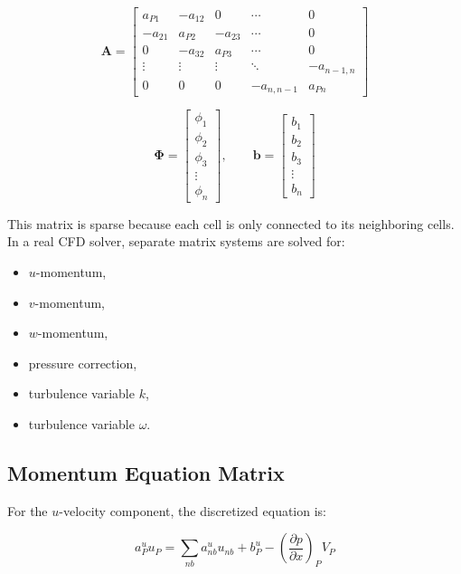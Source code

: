 \documentclass[12pt,a4paper]{article}
\begin{document}
\begin{equation}
\bm{A}
=
\begin{bmatrix}
a_{P1} & -a_{12} & 0 & \cdots & 0 \\
-a_{21} & a_{P2} & -a_{23} & \cdots & 0 \\
0 & -a_{32} & a_{P3} & \cdots & 0 \\
\vdots & \vdots & \vdots & \ddots & -a_{n-1,n} \\
0 & 0 & 0 & -a_{n,n-1} & a_{Pn}
\end{bmatrix}
\end{equation}

\begin{equation}
\bm{\Phi}
=
\begin{bmatrix}
\phi_1\\
\phi_2\\
\phi_3\\
\vdots\\
\phi_n
\end{bmatrix},
\qquad
\bm{b}
=
\begin{bmatrix}
b_1\\
b_2\\
b_3\\
\vdots\\
b_n
\end{bmatrix}
\end{equation}

This matrix is sparse because each cell is only connected to its neighboring cells. In a real CFD solver, separate matrix systems are solved for:

\begin{itemize}
    \item \(u\)-momentum,
    \item \(v\)-momentum,
    \item \(w\)-momentum,
    \item pressure correction,
    \item turbulence variable \(k\),
    \item turbulence variable \(\omega\).
\end{itemize}

\subsection{Momentum Equation Matrix}

For the \(u\)-velocity component, the discretized equation is:

\begin{equation}
    a_P^u u_P =\sum_{nb} a_{nb}^u u_{nb}+b_P^u-\left(\frac{\partial p}{\partial x} \right)_P V_P
\end{equation}
\end{document}
